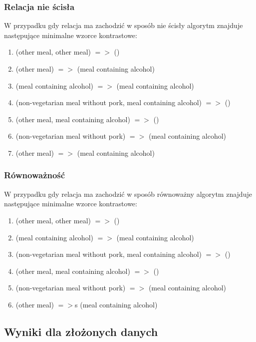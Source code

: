 \documentclass[a4paper,12pt]{article}
\begin{document}
\subsubsection{Relacja nie ścisła}

W przypadku gdy relacja ma zachodzić w sposób nie ścisły algorytm znajduje następujące minimalne wzorce kontrastowe:

\begin{enumerate}
\item (other meal, other meal) $=>$ ()
\item (other meal) $=>$ (meal containing alcohol)
\item (meal containing alcohol) $=>$ (meal containing alcohol)
\item (non-vegetarian meal without pork, meal containing alcohol) $=>$ ()
\item (other meal, meal containing alcohol) $=>$ ()
\item (non-vegetarian meal without pork) $=>$ (meal containing alcohol)
\item (other meal) $=>$ (meal containing alcohol)
\end{enumerate}

\subsubsection{Równoważność}

W przypadku gdy relacja ma zachodzić w sposób równoważny algorytm znajduje następujące minimalne wzorce kontrastowe:

\begin{enumerate}
\item (other meal, other meal) $=>$ ()
\item (meal containing alcohol) $=>$ (meal containing alcohol)
\item (non-vegetarian meal without pork, meal containing alcohol) $=>$ ()
\item (other meal, meal containing alcohol) $=>$ ()
\item (non-vegetarian meal without pork) $=>$ (meal containing alcohol)
\item (other meal) $=>$s (meal containing alcohol)
\end{enumerate}

\subsection{Wyniki dla złożonych danych}
\end{document}
